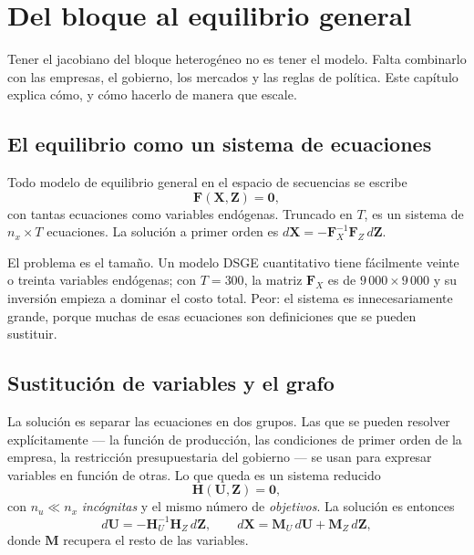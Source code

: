 \chapter{Del bloque al equilibrio general}
\label{cap:dag}

Tener el jacobiano del bloque heterogéneo no es tener el modelo. Falta
combinarlo con las empresas, el gobierno, los mercados y las reglas de política.
Este capítulo explica cómo, y cómo hacerlo de manera que escale.

\section{El equilibrio como un sistema de ecuaciones}

Todo modelo de equilibrio general en el espacio de secuencias se escribe
\begin{equation}
\mathbf{F}(\mathbf{X}, \mathbf{Z}) = \mathbf{0},
\label{eq:F}
\end{equation}
con tantas ecuaciones como variables endógenas. Truncado en $T$, es un sistema
de $n_x \times T$ ecuaciones. La solución a primer orden es
$d\mathbf{X} = -\mathbf{F}_X^{-1}\mathbf{F}_Z\,d\mathbf{Z}$.

El problema es el tamaño. Un modelo DSGE cuantitativo tiene fácilmente veinte o
treinta variables endógenas; con $T=300$, la matriz $\mathbf{F}_X$ es de
$9\,000\times 9\,000$ y su inversión empieza a dominar el costo total. Peor: el
sistema es innecesariamente grande, porque muchas de esas ecuaciones son
definiciones que se pueden sustituir.

\section{Sustitución de variables y el grafo}

La solución es separar las ecuaciones en dos grupos. Las que se pueden resolver
explícitamente --- la función de producción, las condiciones de primer orden de
la empresa, la restricción presupuestaria del gobierno --- se usan para expresar
variables en función de otras. Lo que queda es un sistema reducido
\begin{equation}
\mathbf{H}(\mathbf{U}, \mathbf{Z}) = \mathbf{0},
\label{eq:H}
\end{equation}
con $n_u \ll n_x$ \emph{incógnitas} y el mismo número de \emph{objetivos}.
La solución es entonces
\begin{equation}
d\mathbf{U} = -\mathbf{H}_U^{-1}\mathbf{H}_Z\,d\mathbf{Z},
\qquad
d\mathbf{X} = \mathbf{M}_U\,d\mathbf{U} + \mathbf{M}_Z\,d\mathbf{Z},
\end{equation}
donde $\mathbf{M}$ recupera el resto de las variables.

